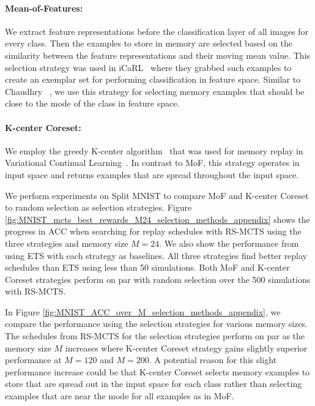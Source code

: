 \paragraph{Mean-of-Features:} We extract feature representations before the classification layer of all images for every class. Then the examples to store in memory are selected based on the similarity between the feature representations and their moving mean value. This selection strategy was used in iCaRL~\cite{rebuffi2017icarl} where they grabbed such examples to create an exemplar set for performing classification in feature space. Similar to Chaudhry \etal~\cite{chaudhry2019tiny}, we use this strategy for selecting memory examples that should be close to the mode of the class in feature space.\vspace{-12pt}

\paragraph{K-center Coreset:} We employ the greedy K-center algorithm~\cite{gonzalez1985clustering} that was used for memory replay in Variational Continual Learning~\cite{nguyen2017variational}. In contrast to MoF, this strategy operates in input space and returns examples that are spread throughout the input space.\vspace{12pt}

We perform experiments on Split MNIST to compare MoF and K-center Coreset to random selection as selection strategies. Figure \ref{fig:MNIST_mcts_best_rewards_M24_selection_methods_appendix} shows the progress in ACC when searching for replay schedules with RS-MCTS using the three strategies and memory size $M=24$. We also show the performance from using ETS with each strategy as baselines. All three strategies find better replay schedules than ETS using less than 50 simulations. Both MoF and K-center Coreset strategies perform on par with random selection over the 500 simulations with RS-MCTS. 

In Figure \ref{fig:MNIST_ACC_over_M_selection_methods_appendix}, we compare the performance using the selection strategies for various memory sizes. The schedules from RS-MCTS for the selection strategies perform on par as the memory size $M$ increases where K-center Coreset strategy gains slightly superior performance at $M=120$ and $M=200$. A potential reason for this slight performance increase could be that K-center Coreset selects memory examples to store that are spread out in the input space for each class rather than selecting examples that are near the mode for all examples as in MoF.   


